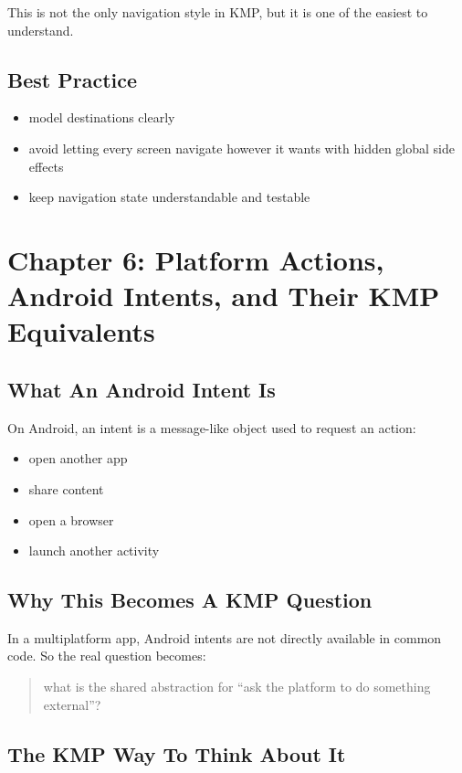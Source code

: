 \documentclass[11pt,a4paper]{article}
\begin{document}
This is not the only navigation style in KMP, but it is one of the easiest to understand.

\subsection{Best Practice}

\begin{itemize}
    \item model destinations clearly
    \item avoid letting every screen navigate however it wants with hidden global side effects
    \item keep navigation state understandable and testable
\end{itemize}

\section{Chapter 6: Platform Actions, Android Intents, and Their KMP Equivalents}

\subsection{What An Android Intent Is}

On Android, an intent is a message-like object used to request an action:
\begin{itemize}
    \item open another app
    \item share content
    \item open a browser
    \item launch another activity
\end{itemize}

\subsection{Why This Becomes A KMP Question}

In a multiplatform app, Android intents are not directly available in common code.
So the real question becomes:

\begin{quote}
what is the shared abstraction for ``ask the platform to do something external''?
\end{quote}

\subsection{The KMP Way To Think About It}
\end{document}
